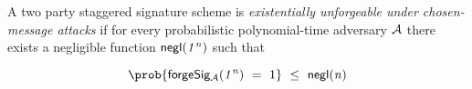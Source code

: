 \begin{definition}
	A two party staggered signature scheme is \emph{existentially unforgeable under chosen-message attacks} if for every probabilistic polynomial-time adversary $\mathcal{A}$ there exists a negligible function $\mathsf{negl}(\mathit{1^n})$ such that 

\[ \prob{\procExpForgeSimple{\varSecParam} \opEqNoQ 1} \opSmEq \funNegl{\varN} \]

\begin{center}
    \fbox{
    \begin{varwidth}{\textwidth}
        \procedure[linenumbering]{$\procExpForgeSimple{\varSecParam}$} {
         \varSet \opAssign \cnstEmptySet \\
        ((\varSecKeyAlice, \varPubKeyAlice), (\varSecKeyBob, \varPubKeyBob)) \opFunResult \procKeyGenPt{\varSecParam}{\varSecParam}\\
        (\varMsg^* \opSeperate \varSignature^*) \opFunResult \cnstAdversary^{\procSignOracle{\cdot}{\cdot}}(\varPubKeyAlice, \varPubKeyBob, \varSecKeyBob) \\
        \pcreturn ((\varMsg) \opNotIn \varSet  \opAnd \procVerFinSig(\varSignature^*, \varMsg^*, \varPubKeyAlice, \varPubKeyBob))
        }\\[2\baselineskip]
        \procedure[linenumbering]{$\procSignOracle{\varMsg}{\varSecKeyBob}$} {
        (\varSigAlice \opSeperate \varSigBob) \opFunResult \procSignPt{\varMsg}{\varSecKeyAlice, \varPubKeyAlice, \varPubKeyBob}{\varSecKeyBob, \varPubKeyAlice, \varPubKeyBob}\\
        \varSet \opAssign \varSet \opUnion \{\varMsg\} \\
        \pcreturn (\varSigAlice \opSeperate \varSigBob)
        }
    \end{varwidth}
    }
\end{center}

\end{definition}




